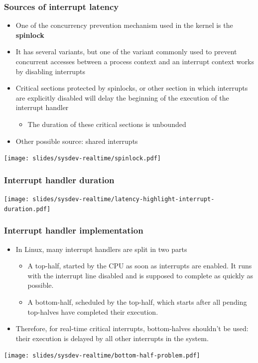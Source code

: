 \begin{frame}
  \frametitle{Sources of interrupt latency}
  \begin{itemize}
  \item One of the concurrency prevention mechanism used in the kernel
    is the {\bf spinlock}
  \item It has several variants, but one of the variant commonly used
    to prevent concurrent accesses between a process context and an
    interrupt context works by disabling interrupts
  \item Critical sections protected by spinlocks, or other section in
    which interrupts are explicitly disabled will delay the beginning
    of the execution of the interrupt handler
    \begin{itemize}
    \item The duration of these critical sections is unbounded
    \end{itemize}
  \item Other possible source: shared interrupts
  \end{itemize}
  \begin{center}
    \texttt{[image: slides/sysdev-realtime/spinlock.pdf]}
  \end{center}
\end{frame}

\begin{frame}
\frametitle{Interrupt handler duration}
  \begin{center}
    \texttt{[image: slides/sysdev-realtime/latency-highlight-interrupt-duration.pdf]}
  \end{center}
\end{frame}

\begin{frame}
  \frametitle{Interrupt handler implementation}
  \begin{itemize}
  \item In Linux, many interrupt handlers are split in two parts
    \begin{itemize}
    \item A top-half, started by the CPU as soon as interrupts are
      enabled. It runs with the interrupt line disabled and is
      supposed to complete as quickly as possible.
    \item A bottom-half, scheduled by the top-half, which starts after
      all pending top-halves have completed their execution.
    \end{itemize}
  \item Therefore, for real-time critical interrupts, bottom-halves
    shouldn't be used: their execution is delayed by all other
    interrupts in the system.
  \end{itemize}
  \begin{center}
    \texttt{[image: slides/sysdev-realtime/bottom-half-problem.pdf]}
  \end{center}
\end{frame}

